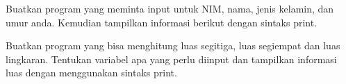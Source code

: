 \begin{latihan}
Buatkan program yang meminta input untuk NIM, nama, jenis kelamin, dan umur anda. Kemudian tampilkan informasi berikut dengan sintaks print.
\end{latihan}

\begin{latihan}
Buatkan program yang bisa menghitung luas segitiga, luas segiempat dan luas lingkaran. Tentukan variabel apa yang perlu diinput dan tampilkan informasi luas dengan menggunakan sintaks print.
\end{latihan}
